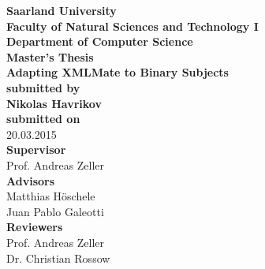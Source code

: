 \begin{titlepage}
\begin{center}
{\LARGE \bfseries Saarland University \\
Faculty of Natural Sciences and Technology I \\[0.1cm]
Department of Computer Science}\\[2.5cm]

{\Large \bfseries Master's Thesis}\\[1cm]
{\LARGE \bfseries Adapting XMLMate to Binary Subjects}\\[2cm]
{\small \bfseries submitted by}\\[0.5cm]
{\large \bfseries Nikolas Havrikov}\\[1cm]
{\small \bfseries submitted on}\\
20.03.2015\\[2.5cm]
{\bfseries Supervisor}\\[0.2cm]
Prof. Andreas Zeller\\[1cm]
{\bfseries Advisors}\\[0.2cm]
Matthias Höschele\\[0.1cm]
Juan Pablo Galeotti\\[1cm]
{\bfseries Reviewers}\\[0.2cm]
Prof. Andreas Zeller\\[0.1cm]
Dr. Christian Rossow
\end{center}
\end{titlepage}